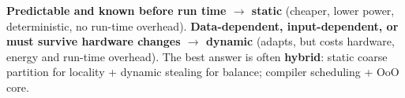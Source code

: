 \normalsize
\begin{key}
\textbf{Predictable and known before run time $\rightarrow$ static} (cheaper, lower power, deterministic, no run-time overhead). \textbf{Data-dependent, input-dependent, or must survive hardware changes $\rightarrow$ dynamic} (adapts, but costs hardware, energy and run-time overhead). The best answer is often \textbf{hybrid}: static coarse partition for locality + dynamic stealing for balance; compiler scheduling + OoO core.
\end{key}
